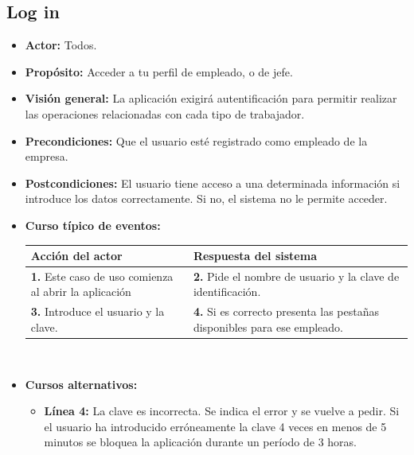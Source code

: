 \documentclass[spanish,a4paper,11pt, twoside]{report}	%
\begin{document}

	\subsection{Log in}		
			\begin{itemize}
			\item \textbf{Actor:} Todos.
			\item \textbf{Propósito:} Acceder a tu perfil de empleado, o de jefe.
			\item \textbf{Visión general:} La aplicación exigirá autentificación para permitir realizar las operaciones relacionadas con cada tipo de trabajador.
			\item \textbf{Precondiciones:} Que el usuario esté registrado como empleado de la empresa.
			\item \textbf{Postcondiciones:} El usuario tiene acceso a una determinada información si introduce los datos correctamente. Si no, el sistema no le permite acceder. 
			\item \textbf{Curso típico de eventos:} 	\\
				\begin{tabular}{|p{6cm}||p{6cm}|}
				\hline
				\textbf{Acción del actor} & \textbf{Respuesta del sistema} \\ \hline \hline
				\textbf{1.} Este caso de uso comienza al abrir la aplicación & \textbf{2.} Pide el nombre de usuario y  la clave de identificación.\\ \hline 
				\textbf{3.} Introduce el usuario y  la clave. & \textbf{4.} Si es correcto presenta las pestañas disponibles para ese empleado.\\ \hline
			\end{tabular}
			\\
			\item \textbf{Cursos alternativos:} 
			\begin{itemize}
			\item  \textbf{Línea 4:} La clave es incorrecta. Se indica el error y se vuelve a pedir. Si el usuario ha introducido erróneamente la clave 4 veces en menos de 5 minutos se bloquea la aplicación durante un período de 3 horas.
			\end {itemize}
		\end{itemize}
\end{document}
